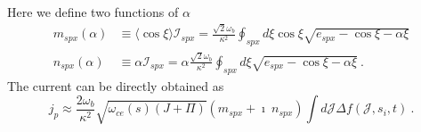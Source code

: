 Here we define two functions of $\alpha$
\begin{equation}
    \begin{aligned}
        m_{spx}(\alpha) & \equiv \langle \cos \xi \rangle  \mathcal{I}_{spx} = \frac{\sqrt{2} \omega_b}{\kappa^2} \oint_{s p x} d \xi \cos \xi \sqrt{e_{s p x}-\cos \xi-\alpha \xi} \\
        n_{spx}(\alpha) & \equiv \alpha \mathcal{I}_{spx} = \alpha \frac{\sqrt{2} \omega_b}{\kappa^2} \oint_{s p x} d \xi \sqrt{e_{s p x}-\cos \xi-\alpha \xi} ~.
    \end{aligned}
\end{equation}
The current can be directly obtained as 
\begin{equation}\label{eq.adi_J}
    j_p \approx \frac{2 \omega_b}{\kappa^2} \sqrt{\omega_{c e}(s)(J+\Pi)}\left(m_{s p x}+\imath ~ n_{s p x}\right) \int d \mathcal{J} \Delta f(\mathcal{J},s_i,t) ~.
\end{equation}

